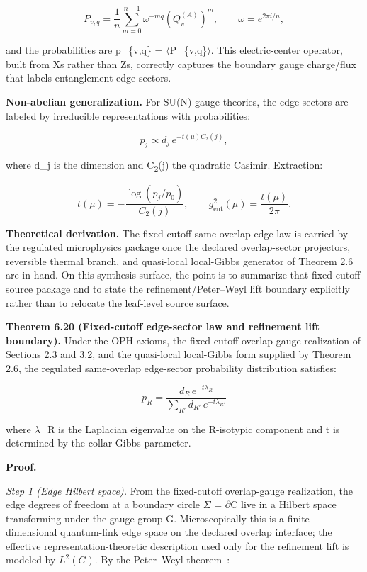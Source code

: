 \[
P_{v,q} = \frac{1}{n} \sum_{m=0}^{n-1} \omega^{-mq} \left(Q_v^{(A)}\right)^m,
\qquad \omega = e^{2\pi i/n},
\]

and the probabilities are p\_\{v,q\} = \ensuremath{\langle}P\_\{v,q\}\ensuremath{\rangle}. This electric-center operator, built from X\textquotesingle s rather than Z\textquotesingle s, correctly captures the boundary gauge charge/flux that labels entanglement edge sectors.

\textbf{Non-abelian generalization.} For SU(N) gauge theories, the edge sectors are labeled by irreducible representations with probabilities:

\[
p_j \propto d_j \, e^{-t(\mu) C_2(j)},
\]

where d\_j is the dimension and C\textsubscript{2}(j) the quadratic Casimir. Extraction:

\[
t(\mu) = -\frac{\log(p_j/p_0)}{C_2(j)}, \qquad
g_{\mathrm{ent}}^2(\mu) = \frac{t(\mu)}{2\pi}.
\]

\textbf{Theoretical derivation.} The fixed-cutoff same-overlap edge law is carried by the
regulated microphysics package once the declared overlap-sector projectors, reversible thermal
branch, and quasi-local local-Gibbs generator of Theorem 2.6 are in hand. On this synthesis
surface, the point is to summarize that fixed-cutoff source package and to state the
refinement/Peter--Weyl lift boundary explicitly rather than to relocate the leaf-level source
surface.

\textbf{Theorem 6.20 (Fixed-cutoff edge-sector law and refinement lift boundary).} Under the OPH
axioms, the fixed-cutoff overlap-gauge realization of Sections 2.3 and 3.2, and the quasi-local
local-Gibbs form supplied by Theorem 2.6, the regulated same-overlap edge-sector probability
distribution satisfies:

\[
p_R = \frac{d_R \, e^{-t \lambda_R}}{\sum_{R'} d_{R'} \, e^{-t \lambda_{R'}}}
\]

where \ensuremath{\lambda}\_R is the Laplacian eigenvalue on the R-isotypic component and t is determined by the collar Gibbs parameter.

\textbf{Proof.}

\emph{Step 1 (Edge Hilbert space).} From the fixed-cutoff overlap-gauge realization, the edge
degrees of freedom at a boundary circle \ensuremath{\Sigma} = \ensuremath{\partial}C live in a
Hilbert space transforming under the gauge group G. Microscopically this is a finite-dimensional
quantum-link edge space on the declared overlap interface; the effective
representation-theoretic description used only for the refinement lift is modeled by \(L^2(G)\).
By the Peter--Weyl theorem~\cite{peterWeyl27}:

